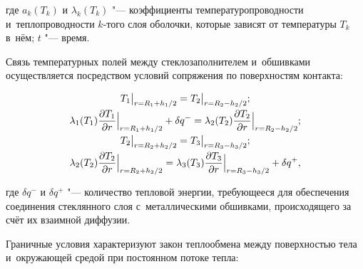 где $a_{k}(T_{k})$ и $\lambda_{k}(T_{k})$ "--- коэффициенты температуропроводности и~теплопроводности $k$-того слоя оболочки, которые зависят от температуры $T_{k}$ в~нём; $t$ "--- время.



Связь температурных полей между стеклозаполнителем и~обшивками осуществляется посредством условий сопряжения по поверхностям контакта:

\begin{equation}

\label{pikul:eq2}

\begin{array}{c}

T_1  \big|_{r=R_1 +{h_1}/{2}} =T_2 \big|_{r=R_2 -{h_2}/{2}}; \vspace{1mm}\\

\displaystyle

\lambda _1 (T_1)\frac{\partial T_1 }{\partial r} \Big|_{r=R_1 +{h_1 }/{2}} +\delta q^{-}=\lambda _2 (T_2)\frac{\partial T_2 }{\partial r} \Big|_{r=R_2-{h_2}/{2}}; \vspace{1mm}\\

T_2  \big|_{r=R_2 +{h_2}/{2}} =T_3\big|_{r=R_3 -{h_3}/{2}} ; \vspace{1mm}\\

\displaystyle

\lambda _2 (T_2)\frac{\partial T_2 }{\partial r} \Big|_{r=R_2 +{h_2}/{2}} =\lambda _3 (T_3)\frac{\partial T_3 }{\partial r} \Big|_{r=R_3 -{h_3}/{2}} 

+\delta q^{+},

\end{array}

\end{equation}

где $\delta q^{-}$ и $\delta q^{+}$ "--- количество тепловой энергии, требующееся для обеспечения соединения стеклянного слоя с~металлическими обшивками, происходящего за счёт их взаимной диффузии.



Граничные условия характеризуют закон теплообмена между поверхностью тела и~окружающей средой при постоянном потоке тепла:

